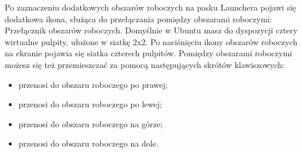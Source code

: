 Po zaznaczeniu dodatkowych obszarów roboczych na pasku Launchera pojawi się dodatkowa ikona, służąca do przełączania pomiędzy obszarami roboczymi: \textcolor{ubuntu_orange}{Przełącznik obszarów roboczych}.
\clearpage
Domyślnie w Ubuntu masz do dyspozycji cztery wirtualne pulpity, ułożone w siatkę 2x2. Po naciśnięciu ikony obszarów roboczych na ekranie pojawia się siatka czterech pulpitów. Pomiędzy obszarami roboczymi możesz się też przemieszczać za pomocą następujących skrótów klawiszowych:
\begin{itemize}
\item {} przenosi do obszaru roboczego po prawej;
\item {} przenosi do obszaru roboczego po lewej;
\item {} przenosi do obszaru roboczego na górze;
\item {} przenosi do obszaru roboczego na dole.
\end{itemize}
